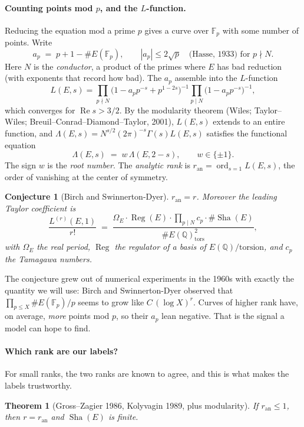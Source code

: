 \documentclass[11pt]{article}
\theoremstyle{definition}
\theoremstyle{plain}
\newtheorem{theorem}[definition]{Theorem}
\newtheorem{conjecture}[definition]{Conjecture}
\theoremstyle{remark}
\newcommand{\Q}{\mathbb{Q}}
\newcommand{\F}{\mathbb{F}}
\renewcommand{\_}{\oldunderscore\allowbreak}
\DeclareMathOperator{\ord}{ord}
\DeclareMathOperator{\Sha}{Sha}
\DeclareMathOperator{\Reg}{Reg}
\begin{document}
\paragraph{Counting points mod $p$, and the $L$-function.}
Reducing the equation mod a prime $p$ gives a curve over $\F_p$ with some number of points.
Write
\[
  a_p\;=\;p+1-\#E(\F_p),\qquad |a_p|\le 2\sqrt p\quad\text{(Hasse, 1933) for } p\nmid N.
\]
Here $N$ is the \emph{conductor}, a product of the primes where $E$ has bad reduction
(with exponents that record how bad). The $a_p$ assemble into the $L$-function
\[
  L(E,s)=\prod_{p\nmid N}\bigl(1-a_pp^{-s}+p^{1-2s}\bigr)^{-1}\prod_{p\mid N}\bigl(1-a_pp^{-s}\bigr)^{-1},
\]
which converges for $\operatorname{Re}s>3/2$. By the modularity theorem (Wiles; Taylor--Wiles;
Breuil--Conrad--Diamond--Taylor, 2001), $L(E,s)$ extends to an entire function, and
$\Lambda(E,s)=N^{s/2}(2\pi)^{-s}\Gamma(s)L(E,s)$ satisfies the functional equation
\begin{equation}\label{eq:fe}
  \Lambda(E,s)\;=\;w\,\Lambda(E,2-s),\qquad w\in\{\pm1\}.
\end{equation}
The sign $w$ is the \emph{root number}. The \emph{analytic rank} is
$r_{\mathrm{an}}=\ord_{s=1}L(E,s)$, the order of vanishing at the center of symmetry.

\begin{conjecture}[Birch and Swinnerton-Dyer]
$r_{\mathrm{an}}=r$. Moreover the leading Taylor coefficient is
\[
  \frac{L^{(r)}(E,1)}{r!}\;=\;\frac{\Omega_E\cdot\Reg(E)\cdot\prod_{p\mid N}c_p\cdot\#\Sha(E)}{\#E(\Q)_{\mathrm{tors}}^{2}},
\]
with $\Omega_E$ the real period, $\Reg$ the regulator of a basis of $E(\Q)/\text{torsion}$,
and $c_p$ the Tamagawa numbers.
\end{conjecture}

\noindent The conjecture grew out of numerical experiments in the 1960s with exactly the
quantity we will use: Birch and Swinnerton-Dyer observed that
$\prod_{p\le X}\#E(\F_p)/p$ seems to grow like $C\,(\log X)^{r}$. Curves of higher rank have,
on average, \emph{more} points mod $p$, so their $a_p$ lean negative. That is the signal a
model can hope to find.

\paragraph{Which rank are our labels?}
For small ranks, the two ranks are known to agree, and this is what makes the labels
trustworthy.

\begin{theorem}[Gross--Zagier 1986, Kolyvagin 1989, plus modularity]
If $r_{\mathrm{an}}\le1$, then $r=r_{\mathrm{an}}$ and $\Sha(E)$ is finite.
\end{theorem}
\end{document}

